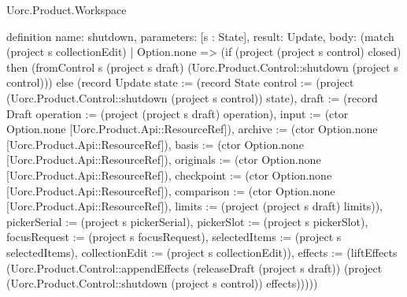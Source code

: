 \begin{lexlean}{Uorc.Product.Workspace}
\begin{semanticmodule}
definition{
  name: shutdown,
  parameters: [s : State],
  result: Update,
  body: (match (project s collectionEdit)
    | Option.none => (if (project (project s control) closed) then (fromControl s (project s draft) (Uorc.Product.Control::shutdown (project s control))) else (record Update {state := (record State {control := (project (Uorc.Product.Control::shutdown (project s control)) state), draft := (record Draft {operation := (project (project s draft) operation), input := (ctor Option.none [Uorc.Product.Api::ResourceRef]), archive := (ctor Option.none [Uorc.Product.Api::ResourceRef]), basis := (ctor Option.none [Uorc.Product.Api::ResourceRef]), originals := (ctor Option.none [Uorc.Product.Api::ResourceRef]), checkpoint := (ctor Option.none [Uorc.Product.Api::ResourceRef]), comparison := (ctor Option.none [Uorc.Product.Api::ResourceRef]), limits := (project (project s draft) limits)}), pickerSerial := (project s pickerSerial), pickerSlot := (project s pickerSlot), focusRequest := (project s focusRequest), selectedItems := (project s selectedItems), collectionEdit := (project s collectionEdit)}), effects := (liftEffects (Uorc.Product.Control::appendEffects (releaseDraft (project s draft)) (project (Uorc.Product.Control::shutdown (project s control)) effects)))}))
}
\end{semanticmodule}
\end{lexlean}
